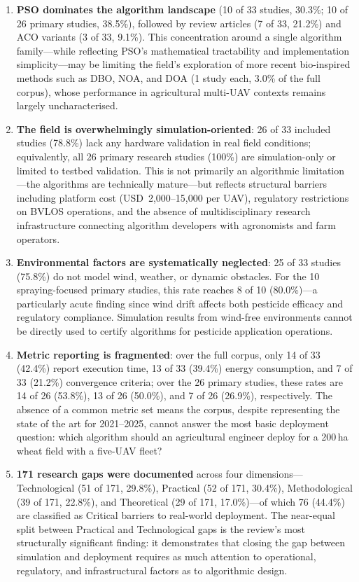 \documentclass[review,3p,times]{elsarticle}
\begin{document}
\begin{enumerate}
  \item \textbf{PSO dominates the algorithm landscape} (10 of 33 studies, 30.3\%; 10 of 26 primary studies, 38.5\%), followed by review articles (7 of 33, 21.2\%) and ACO variants (3 of 33, 9.1\%). This concentration around a single algorithm family---while reflecting PSO's mathematical tractability and implementation simplicity---may be limiting the field's exploration of more recent bio-inspired methods such as DBO, NOA, and DOA (1 study each, 3.0\% of the full corpus), whose performance in agricultural multi-UAV contexts remains largely uncharacterised.

  \item \textbf{The field is overwhelmingly simulation-oriented}: 26 of 33 included studies (78.8\%) lack any hardware validation in real field conditions; equivalently, all 26 primary research studies (100\%) are simulation-only or limited to testbed validation. This is not primarily an algorithmic limitation---the algorithms are technically mature---but reflects structural barriers including platform cost (USD~2,000--15,000 per UAV), regulatory restrictions on BVLOS operations, and the absence of multidisciplinary research infrastructure connecting algorithm developers with agronomists and farm operators.

  \item \textbf{Environmental factors are systematically neglected}: 25 of 33 studies (75.8\%) do not model wind, weather, or dynamic obstacles. For the 10 spraying-focused primary studies, this rate reaches 8 of 10 (80.0\%)---a particularly acute finding since wind drift affects both pesticide efficacy and regulatory compliance. Simulation results from wind-free environments cannot be directly used to certify algorithms for pesticide application operations.

  \item \textbf{Metric reporting is fragmented}: over the full corpus, only 14 of 33 (42.4\%) report execution time, 13 of 33 (39.4\%) energy consumption, and 7 of 33 (21.2\%) convergence criteria; over the 26 primary studies, these rates are 14 of 26 (53.8\%), 13 of 26 (50.0\%), and 7 of 26 (26.9\%), respectively. The absence of a common metric set means the corpus, despite representing the state of the art for 2021--2025, cannot answer the most basic deployment question: which algorithm should an agricultural engineer deploy for a 200\,ha wheat field with a five-UAV fleet?

  \item \textbf{171 research gaps were documented} across four dimensions---Technological (51 of 171, 29.8\%), Practical (52 of 171, 30.4\%), Methodological (39 of 171, 22.8\%), and Theoretical (29 of 171, 17.0\%)---of which 76 (44.4\%) are classified as Critical barriers to real-world deployment. The near-equal split between Practical and Technological gaps is the review's most structurally significant finding: it demonstrates that closing the gap between simulation and deployment requires as much attention to operational, regulatory, and infrastructural factors as to algorithmic design.
\end{enumerate}
\end{document}
